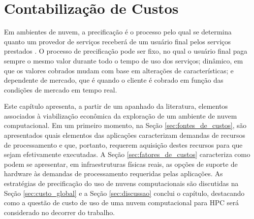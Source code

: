 \documentclass[tese,capa]{texufpel}
\begin{document}

\chapter{Contabilização de Custos}\label{chap:contabilizacao_de_custos}

Em ambientes de nuvem, a precificação é o processo pelo qual se determina quanto um provedor de serviços receberá de um usuário final pelos serviços prestados \cite{al-roomiCloudComputingPricing2013}. O processo de precificação pode ser fixo, no qual o usuário final paga sempre o mesmo valor durante todo o tempo de uso dos serviços; dinâmico, em que os valores cobrados mudam com base em alterações de características; e dependente de mercado, que é quando o cliente é cobrado em função das condições de mercado em tempo real.

Este capítulo apresenta, a partir de um apanhado da literatura, elementos associados à viabilização econômica da exploração de um ambiente de nuvem computacional. Em um primeiro momento, na Seção \ref{sec:fontes_de_custos}, são apresentados quais elementos das aplicações caracterizam demandas de recursos de processamento e que, portanto, requerem aquisição destes recursos para que sejam efetivamente executadas. A Seção \ref{sec:fatores_de_custos} caracteriza como podem se apresentar, em infraestruturas físicas reais, as opções de suporte de hardware às demandas de processamento requeridas pelas aplicações. As estratégias de precificação do uso de nuvens computacionais são discutidas na Seção \ref{sec:custo_global} e a Seção \ref{sec:discussao} conclui o capítulo, destacando como a questão de custo de uso de uma nuvem computacional para HPC será considerado no decorrer do trabalho.

\end{document}
